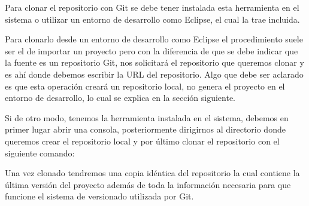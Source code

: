 Para clonar el repositorio con Git se debe tener instalada esta herramienta en el sistema \cite{instalacion_git} o utilizar un entorno de desarrollo como Eclipse, el cual la trae incluida. 

Para clonarlo desde un entorno de desarrollo como Eclipse \cite{eclipse} el procedimiento suele ser el de importar un proyecto pero con la diferencia de que se debe indicar que la fuente es un repositorio Git, nos solicitar\'a el repositorio que queremos clonar y es ah\'i donde debemos escribir la URL del repositorio. Algo que debe ser aclarado es que esta operación crear\'a un repositorio local, no genera el proyecto en el entorno de desarrollo, lo cual se explica en la sección siguiente.

Si de otro modo, tenemos la herramienta instalada en el sistema, debemos en primer lugar abrir una consola, posteriormente dirigirnos al directorio donde queremos crear el repositorio local y por \'ultimo clonar el repositorio con el siguiente comando:


Una vez clonado tendremos una copia idéntica del repositorio la cual contiene la \'ultima versi\'on del proyecto adem\'as de toda la información necesaria para que funcione el sistema de versionado utilizada por Git. 